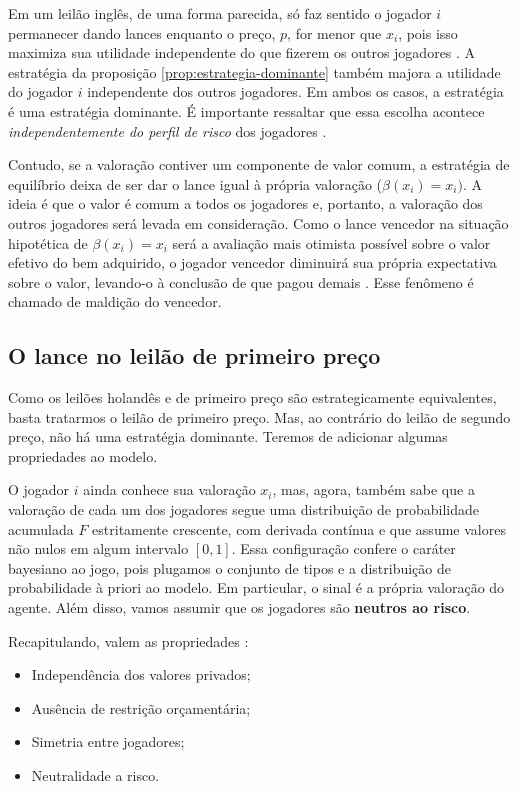 Em um leilão inglês, de uma forma parecida, só faz sentido o jogador $i$ permanecer dando lances enquanto o preço, $p$, for menor que $x_i$, pois isso maximiza sua utilidade independente do que fizerem os outros jogadores \citet{karlin2017game}. A estratégia da proposição \ref{prop:estrategia-dominante} também majora a utilidade do jogador $i$ independente dos outros jogadores. Em ambos os casos, a estratégia é uma estratégia dominante. É importante ressaltar que essa escolha acontece \emph{independentemente do perfil de risco} dos jogadores \citet{Shoham2008}.

Contudo, se a valoração contiver um componente de valor comum, a estratégia de equilíbrio deixa de ser dar o lance igual à própria valoração ($\beta(x_i) = x_i)$. A ideia é que o valor é comum a todos os jogadores e, portanto, a valoração dos outros jogadores será levada em consideração. Como o lance vencedor na situação hipotética de $\beta(x_i) = x_i$ será a avaliação mais otimista possível sobre o valor efetivo do bem adquirido, o jogador vencedor diminuirá sua própria expectativa sobre o valor, levando-o à conclusão de que pagou demais \citet{Shoham2008}. Esse fenômeno é chamado de maldição do vencedor.

\subsection{O lance no leilão de primeiro preço}

Como os leilões holandês e de primeiro preço são estrategicamente equivalentes, basta tratarmos o leilão de primeiro preço. Mas, ao contrário do leilão de segundo preço, não há uma estratégia dominante. Teremos de adicionar algumas propriedades ao modelo.

O jogador $i$ ainda conhece sua valoração $x_i$, mas, agora, também sabe que a valoração de cada um dos jogadores segue uma distribuição de probabilidade acumulada $F$ estritamente crescente, com derivada contínua e que assume valores não nulos em algum intervalo $[0, 1]$. Essa configuração confere o caráter bayesiano ao jogo, pois plugamos o conjunto de tipos e a distribuição de probabilidade à priori ao modelo. Em particular, o sinal é a própria valoração do agente. Além disso, vamos assumir que os jogadores são \textbf{neutros ao risco}.

Recapitulando, valem as propriedades \citet{krishna}:
\begin{itemize}
	\item Independência dos valores privados;
	\item Ausência de restrição orçamentária;
	\item Simetria entre jogadores;
	\item Neutralidade a risco.
\end{itemize}

